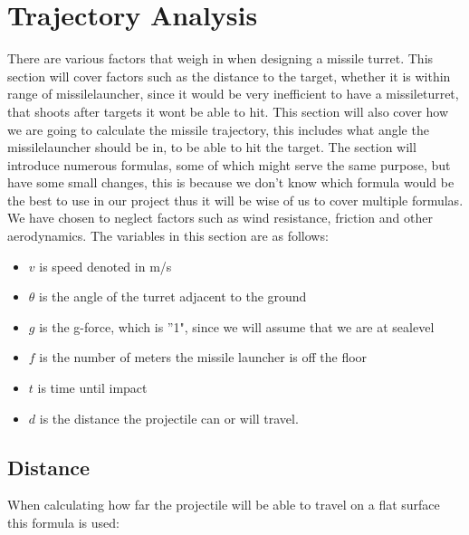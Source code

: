 \section*{Trajectory Analysis}
There are various factors that weigh in when designing a missile turret. This section will cover factors such as the distance to the target, whether it is within range of missilelauncher, since it would be very inefficient to have a missileturret, that shoots after targets it wont be able to hit. This section will also cover how we are going to calculate the missile trajectory, this includes what angle the missilelauncher should be in, to be able to hit the target. The section will introduce numerous formulas, some of which might serve the same purpose, but have some small changes, this is because we don't know which formula would be the best to use in our project thus it will be wise of us to cover multiple formulas.
We have chosen to neglect factors such as wind resistance, friction and other aerodynamics.
The variables in this section are as follows:
\begin{itemize}
\item \begin{math}v\end{math} is speed denoted in m/s
\item \begin{math}\theta\end{math} is the angle of the turret adjacent to the ground
\item \begin{math}g\end{math} is the g-force, which is ''1", since we will assume that we are at sealevel
\item \begin{math}f\end{math} is the number of meters the missile launcher is off the floor 
\item \begin{math}t\end{math} is time until impact
\item \begin{math}d\end{math} is the distance the projectile can or will travel.
\end{itemize}

\subsection*{Distance}
When calculating how far the projectile will be able to travel on a flat surface this formula is used:

